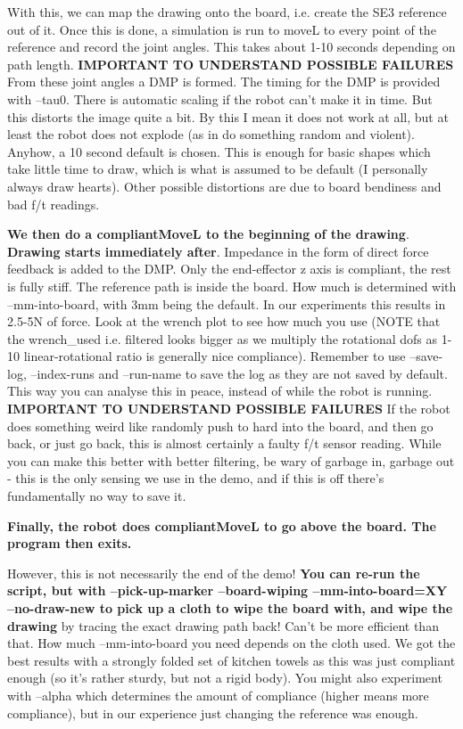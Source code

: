 \documentclass{article}
\begin{document}
With this, we can map the drawing onto the board, i.e. create the SE3 reference
out of it.
Once this is done, a simulation is run to moveL to every point of the reference
and record the joint angles. This takes about 1-10 seconds depending on path length.
\textbf{IMPORTANT TO UNDERSTAND POSSIBLE FAILURES} From these joint angles a DMP is formed. 
The timing for the DMP is provided with --tau0.
There is automatic scaling if the robot can't make it in time.
But this distorts the image quite a bit. By this I mean it does not work at all,
but at least the robot does not explode (as in do something random and violent). 
Anyhow, a 10 second default is chosen.
This is enough for basic shapes which take little time to draw,
which is what is assumed to be default (I personally always draw hearts).
Other possible distortions are due to board bendiness and bad f/t readings.

\textbf{We then do a compliantMoveL to the beginning of the drawing}.
\textbf{Drawing starts immediately after}. Impedance
in the form of direct force feedback is added to the DMP.
Only the end-effector z axis is compliant, the rest is fully stiff.
The reference path is inside the board. How much is determined
with --mm-into-board, with 3mm being the default.
In our experiments this results in 2.5-5N of force.
Look at the wrench plot to see how much you use (NOTE that the wrench\_used i.e. filtered looks bigger
as we multiply the rotational dofs as 1-10 linear-rotational ratio is
generally nice compliance). Remember to use
 --save-log, --index-runs and --run-name to save the log as they are not saved by default.
 This way you can analyse this in peace, instead of while the robot is running.
\textbf{IMPORTANT TO UNDERSTAND POSSIBLE FAILURES} If the robot does something
weird like randomly push to hard into the board, and then go back,
or just go back, this is almost certainly a faulty f/t sensor reading.
While you can make this better with better filtering, be wary
of garbage in, garbage out - this is the only sensing we use in the demo,
and if this is off there's fundamentally no way to save it.

\textbf{Finally, the robot does compliantMoveL to go above the board.
The program then exits.}

However, this is not necessarily the end of the demo!
\textbf{You can re-run the script, but with
--pick-up-marker --board-wiping --mm-into-board=XY --no-draw-new 
to pick up a cloth to wipe the board with, and wipe the drawing}
by tracing the exact drawing path back! Can't be more efficient than that.
How much --mm-into-board you need depends on the cloth used.
We got the best results with a strongly folded set of kitchen towels
as this was just compliant enough (so it's rather sturdy, but not a rigid body).
You might also experiment with --alpha which determines
the amount of compliance (higher means more compliance),
but in our experience just changing the reference was enough.
\end{document}
